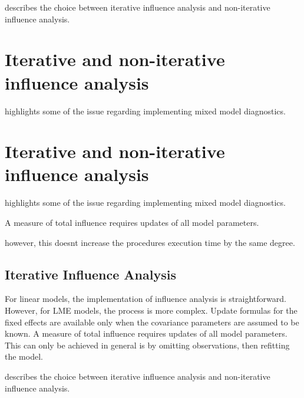\documentclass[12pt, a4paper]{article}
\begin{document}
\citet{schabenberger} describes the choice between  iterative influence analysis and  non-iterative influence analysis.

		\newpage
		\section{Iterative and non-iterative influence analysis} %
		\citet{schab} highlights some of the issue regarding implementing mixed model diagnostics.
		
		

		
		
		
		

	
\section{Iterative and non-iterative influence analysis} %
\citet{schabenberger} highlights some of the issue regarding implementing mixed model diagnostics.

A measure of total influence requires updates of all model parameters.

however, this doesnt increase the procedures execution time by the same degree.
\subsection{Iterative Influence Analysis}

For linear models, the implementation of influence analysis is straightforward.
However, for LME models, the process is more complex. Update formulas for the fixed effects are available only when the covariance parameters are assumed to be known. A measure of total influence requires updates of all model parameters.
This can only be achieved in general is by omitting observations, then refitting the model.

\citet{schabenberger} describes the choice between  iterative influence analysis and  non-iterative influence analysis.



	
	
\end{document}
